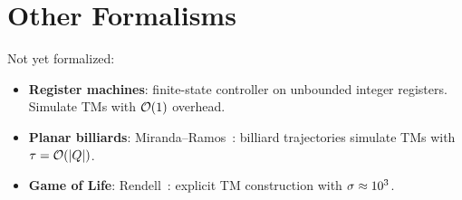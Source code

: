 \section{Other Formalisms}

Not yet formalized:
\begin{itemize}
\item \textbf{Register machines}: finite-state controller on unbounded integer
  registers. Simulate TMs with $\mathcal{O}(1)$ overhead.
\item \textbf{Planar billiards}: Miranda--Ramos~\cite{miranda2025billiards}:
  billiard trajectories simulate TMs with $\tau = \mathcal{O}(|Q|)$.
\item \textbf{Game of Life}: Rendell~\cite{rendell2002turing}: explicit TM
  construction with $\sigma \approx 10^3$.
\end{itemize}

